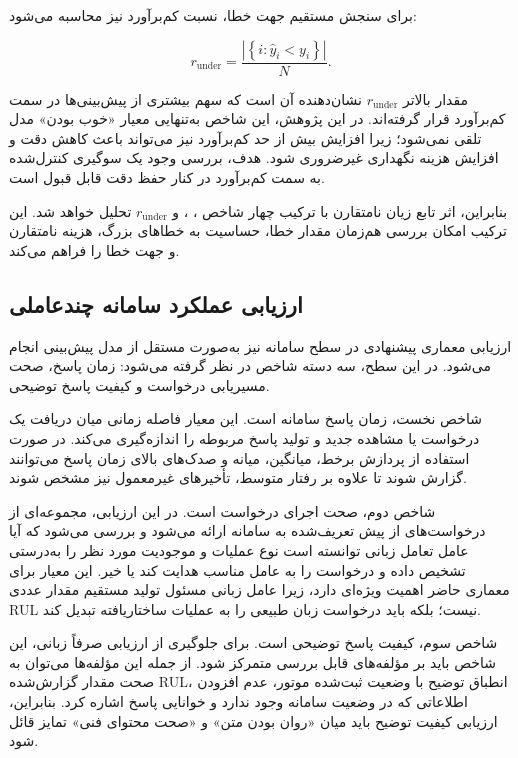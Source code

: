 برای سنجش مستقیم جهت خطا، نسبت کم‌برآورد نیز محاسبه می‌شود:

\begin{equation}
	\label{eq:bias-ratio}
	r_{\mathrm{under}}
	=
	\frac{
		\left|
		\left\{
		i:\hat{y}_i<y_i
		\right\}
		\right|
	}{
		N
	}.
\end{equation}

مقدار بالاتر $r_{\mathrm{under}}$ نشان‌دهنده آن است که سهم بیشتری
از پیش‌بینی‌ها در سمت کم‌برآورد قرار گرفته‌اند. در این پژوهش،
این شاخص به‌تنهایی معیار «خوب بودن» مدل تلقی نمی‌شود؛ زیرا
افزایش بیش از حد کم‌برآورد نیز می‌تواند باعث کاهش دقت و افزایش
هزینه نگهداری غیرضروری شود. هدف، بررسی وجود یک سوگیری کنترل‌شده
به سمت کم‌برآورد در کنار حفظ دقت قابل قبول است.

بنابراین، اثر تابع زیان نامتقارن با ترکیب چهار شاخص
، 
،
و 
$r_{\mathrm{under}}$ 
تحلیل خواهد شد. این ترکیب امکان بررسی هم‌زمان مقدار خطا، حساسیت به
خطاهای بزرگ، هزینه نامتقارن و جهت خطا را فراهم می‌کند.





\subsection{ارزیابی عملکرد سامانه چندعاملی}
\label{sec:multiagent-metrics}

ارزیابی معماری پیشنهادی در سطح سامانه نیز به‌صورت مستقل از مدل
پیش‌بینی انجام می‌شود. در این سطح، سه دسته شاخص در نظر گرفته
می‌شود: زمان پاسخ، صحت مسیریابی درخواست و کیفیت پاسخ توضیحی.

شاخص نخست، زمان پاسخ سامانه است. این معیار فاصله زمانی میان
دریافت یک درخواست یا مشاهده جدید و تولید پاسخ مربوطه را اندازه‌گیری
می‌کند. در صورت استفاده از پردازش برخط، میانگین، میانه و صدک‌های
بالای زمان پاسخ می‌توانند گزارش شوند تا علاوه بر رفتار متوسط،
تأخیرهای غیرمعمول نیز مشخص شوند.

شاخص دوم، صحت اجرای درخواست است. در این ارزیابی، مجموعه‌ای از
درخواست‌های از پیش تعریف‌شده به سامانه ارائه می‌شود و بررسی
می‌شود که آیا عامل تعامل زبانی توانسته است نوع عملیات و موجودیت
مورد نظر را به‌درستی تشخیص داده و درخواست را به عامل مناسب
هدایت کند یا خیر. این معیار برای معماری حاضر اهمیت ویژه‌ای دارد،
زیرا عامل زبانی مسئول تولید مستقیم مقدار عددی \gls{RUL} نیست؛
بلکه باید درخواست زبان طبیعی را به عملیات ساختاریافته تبدیل کند.

شاخص سوم، کیفیت پاسخ توضیحی است. برای جلوگیری از ارزیابی صرفاً
زبانی، این شاخص باید بر مؤلفه‌های قابل بررسی متمرکز شود. از جمله
این مؤلفه‌ها می‌توان به صحت مقدار گزارش‌شده \gls{RUL}، انطباق
توضیح با وضعیت ثبت‌شده موتور، عدم افزودن اطلاعاتی که در وضعیت
سامانه وجود ندارد و خوانایی پاسخ اشاره کرد. بنابراین، ارزیابی
کیفیت توضیح باید میان «روان بودن متن» و «صحت محتوای فنی» تمایز
قائل شود.

